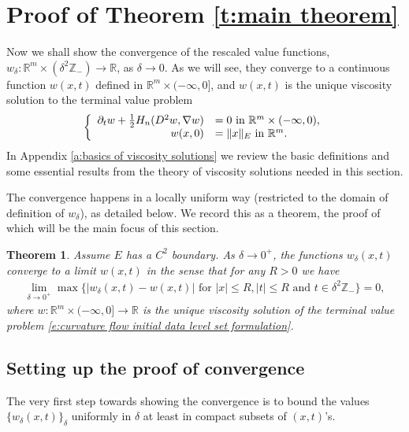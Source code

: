 \documentclass[reqno]{amsart}
\newtheorem{theorem}{Theorem}[section]
\numberwithin{equation}{section}
\begin{document}
\section{Proof of Theorem \ref{t:main theorem}}\label{s:continuous limit}

Now we shall show the convergence of the rescaled value functions, $w_\delta:\mathbb{R}^m\times (\delta^2 \mathbb{Z}_-)\to\mathbb{R}$, as $\delta\to 0$. As we will see, they converge to a continuous function $w(x,t)$ defined in $\mathbb{R}^m\times (-\infty,0]$, and $w(x,t)$ is the unique viscosity solution to the terminal value problem 
\begin{align}
    \left \{ \begin{array}{rl} \partial_t w +\tfrac{1}{2}H_n(D^2w,\nabla w)  & = 0 \textnormal{ in } \mathbb{R}^m\times (-\infty,0),\\
    w(x,0) & = \|x\|_E \textnormal{ in } \mathbb{R}^m. \end{array} \right.\label{e:curvature flow initial data level set formulation}
\end{align}
In Appendix \ref{a:basics of viscosity solutions} we review the basic definitions and some essential results from the theory of viscosity solutions needed in this section. 

The convergence happens in a locally uniform way (restricted to the domain of definition of $w_\delta$), as detailed below. We record this as a theorem, the proof of which will be the main focus of this section.

\begin{theorem}\label{t:continuum limit smooth E case}
  Assume $E$ has a $C^2$ boundary. As $\delta \to 0^+$, the functions $w_\delta(x,t)$ converge to a limit $w(x,t)$ in the sense that for any $R>0$ we have
  \begin{align*}
    \lim \limits_{\delta \to 0^+} \max \{ |w_\delta(x,t)-w(x,t)| \text{ for } |x| \leq R,|t|\leq R \text{ and } t \in \delta^2 \mathbb{Z}_-\} = 0,
  \end{align*}
  where $w: \mathbb{R}^m\times (-\infty,0] \to \mathbb{R}$ is the unique viscosity solution of the terminal value problem \eqref{e:curvature flow initial data level set formulation}.

\end{theorem}


\subsection{Setting up the proof of convergence} The very first step towards showing the convergence is to bound the values $\{w_\delta(x,t)\}_\delta$ uniformly in $\delta$ at least in compact subsets of $(x,t)$'s.
\end{document}
